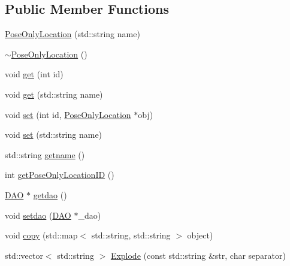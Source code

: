 \subsection*{Public Member Functions}
\begin{DoxyCompactItemize}
\item 
\hyperlink{class_pose_only_location_a8f3ae3cc646d5e28e3d91038615c41ef}{PoseOnlyLocation} (std::string name)
\item 
\hyperlink{class_pose_only_location_afaacdd4bc8f1daf3bd04bf42542f4c4d}{$\sim$PoseOnlyLocation} ()
\item 
void \hyperlink{class_pose_only_location_afbdc6742455d0030005d84eb29875c71}{get} (int id)
\item 
void \hyperlink{class_pose_only_location_a6cf43cbfcfa2673e114007d7f0b76f21}{get} (std::string name)
\item 
void \hyperlink{class_pose_only_location_a95bd88213f16e5187afbca432249bb40}{set} (int id, \hyperlink{class_pose_only_location}{PoseOnlyLocation} $\ast$obj)
\item 
void \hyperlink{class_pose_only_location_aa9b42c8410326f74ca5f11110e6b3d76}{set} (std::string name)
\item 
std::string \hyperlink{class_pose_only_location_aa0c28cd150879da0d59275678e618569}{getname} ()
\item 
int \hyperlink{class_pose_only_location_a8d634d6652ec620b51002a0578f6c820}{getPoseOnlyLocationID} ()
\item 
\hyperlink{class_d_a_o}{DAO} $\ast$ \hyperlink{class_pose_only_location_ab701be60dda6cf1be3bb3fd6098c557c}{getdao} ()
\item 
void \hyperlink{class_pose_only_location_aa51f136b549fd9ddc9a89246fa94c5bc}{setdao} (\hyperlink{class_d_a_o}{DAO} $\ast$\_\-dao)
\item 
void \hyperlink{class_pose_only_location_a6c9a967c1e1cb3b7402bbb9a4f9ee215}{copy} (std::map$<$ std::string, std::string $>$ object)
\item 
std::vector$<$ std::string $>$ \hyperlink{class_pose_only_location_abc85e3e3f6bb4acbec59b8eefd50f8f8}{Explode} (const std::string \&str, char separator)
\end{DoxyCompactItemize}


